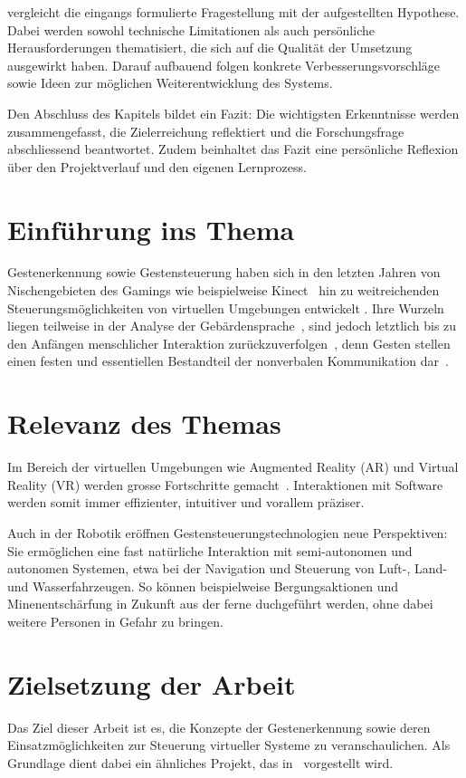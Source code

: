  vergleicht die eingangs formulierte Fragestellung mit der aufgestellten Hypothese.
Dabei werden sowohl technische Limitationen als auch persönliche Herausforderungen thematisiert, die sich auf die Qualität der Umsetzung ausgewirkt haben.
Darauf aufbauend folgen konkrete Verbesserungsvorschläge sowie Ideen zur möglichen Weiterentwicklung des Systems.

Den Abschluss des Kapitels bildet ein Fazit: Die wichtigsten Erkenntnisse werden zusammengefasst, die Zielerreichung reflektiert und die Forschungsfrage abschliessend beantwortet.
Zudem beinhaltet das Fazit eine persönliche Reflexion über den Projektverlauf und den eigenen Lernprozess.

\section{Einführung ins Thema}
Gestenerkennung sowie Gestensteuerung haben sich in den letzten Jahren von Nischengebieten des Gamings wie beispielweise Kinect~\cite{Wiki:Kinect} hin zu weitreichenden Steuerungsmöglichkeiten von virtuellen Umgebungen entwickelt \cite{RG:GestureRecognition}.
Ihre Wurzeln liegen teilweise in der Analyse der Gebärdensprache~\cite{Wiki:Gestenerkennung}, sind jedoch letztlich bis zu den Anfängen menschlicher Interaktion zurückzuverfolgen~\cite{RG:Gesten}, denn Gesten stellen einen festen und essentiellen Bestandteil der nonverbalen Kommunikation dar~\cite[10]{Hobmair:Psy}.

\section{Relevanz des Themas}
Im Bereich der virtuellen Umgebungen wie Augmented Reality (AR) und Virtual Reality (VR) werden grosse Fortschritte gemacht~\cite{SD:VR}.
Interaktionen mit Software werden somit immer effizienter, intuitiver und vorallem präziser.

Auch in der Robotik eröffnen Gestensteuerungstechnologien neue Perspektiven: Sie ermöglichen eine fast natürliche Interaktion mit semi-autonomen und autonomen Systemen, etwa bei der Navigation und Steuerung von Luft-, Land- und Wasserfahrzeugen.
So können beispielweise Bergungsaktionen und Minenentschärfung in Zukunft aus der ferne duchgeführt werden, ohne dabei weitere Personen in Gefahr zu bringen.

\section{Zielsetzung der Arbeit}
Das Ziel dieser Arbeit ist es, die Konzepte der Gestenerkennung sowie deren Einsatzmöglichkeiten zur Steuerung virtueller Systeme zu veranschaulichen.
Als Grundlage dient dabei ein ähnliches Projekt, das in~\cite{arxiv:OmniRace} vorgestellt wird.

